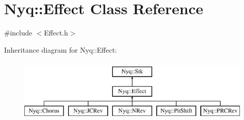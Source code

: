 \hypertarget{class_nyq_1_1_effect}{}\section{Nyq\+:\+:Effect Class Reference}
\label{class_nyq_1_1_effect}


{\ttfamily \#include $<$Effect.\+h$>$}

Inheritance diagram for Nyq\+:\+:Effect\+:\begin{figure}[H]
\begin{center}
\leavevmode
\includegraphics[height=3.000000cm]{class_nyq_1_1_effect}
\end{center}
\end{figure}

